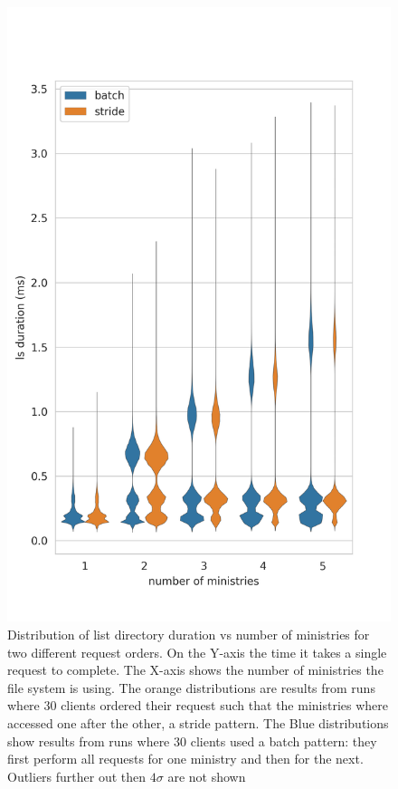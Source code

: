 \begin{figure}[bp]
	\centering
	\includegraphics[height=\textheight]{../results/plots/ls_vs_numb_ministries.png}
	\caption{Distribution of list directory duration vs number of ministries for two different request orders. On the Y-axis the time it takes a single request to complete. The X-axis shows the number of ministries the file system is using. The orange distributions are results from runs where $30$ clients ordered their request such that the ministries where accessed one after the other, a stride pattern. The Blue distributions show results from runs where $30$ clients used a batch pattern: they first perform all requests for one ministry and then for the next. Outliers further out then $4\sigma$ are not shown}
	\label{fig:ls_vs_ministries}
\end{figure}%

